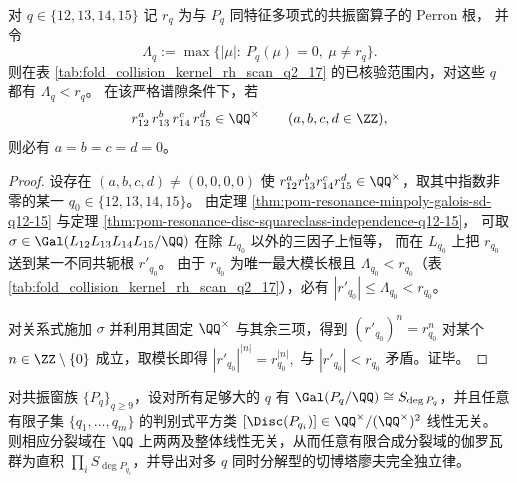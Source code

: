 \begin{theorem}\label{thm:pom-resonance-perron-multiplicative-independence-q12-15}
对 \(q\in\{12,13,14,15\}\) 记 \(r_q\) 为与 \(P_q\) 同特征多项式的共振窗算子的 Perron 根，
并令
\[
\Lambda_q:=\max\{|\mu|:\ P_q(\mu)=0,\ \mu\neq r_q\}.
\]
则在表 \ref{tab:fold_collision_kernel_rh_scan_q2_17} 的已核验范围内，对这些 \(q\) 都有 \(\Lambda_q<r_q\)。
在该严格谱隙条件下，若
\[
r_{12}^{a}\,r_{13}^{b}\,r_{14}^{c}\,r_{15}^{d}\in\QQ^\times
\qquad(a,b,c,d\in\ZZ),
\]
则必有 \(a=b=c=d=0\)。
\end{theorem}
\begin{proof}
设存在 \((a,b,c,d)\neq (0,0,0,0)\) 使 \(r_{12}^{a}r_{13}^{b}r_{14}^{c}r_{15}^{d}\in\QQ^\times\)，取其中指数非零的某一 \(q_0\in\{12,13,14,15\}\)。
由定理 \ref{thm:pom-resonance-minpoly-galois-sd-q12-15} 与定理 \ref{thm:pom-resonance-disc-squareclass-independence-q12-15}，
可取 \(\sigma\in\Gal(L_{12}L_{13}L_{14}L_{15}/\QQ)\) 在除 \(L_{q_0}\) 以外的三因子上恒等，
而在 \(L_{q_0}\) 上把 \(r_{q_0}\) 送到某一不同共轭根 \(r'_{q_0}\)。
由于 \(r_{q_0}\) 为唯一最大模长根且 \(\Lambda_{q_0}<r_{q_0}\)（表 \ref{tab:fold_collision_kernel_rh_scan_q2_17}），必有 \(|r'_{q_0}|\le \Lambda_{q_0}<r_{q_0}\)。

对关系式施加 \(\sigma\) 并利用其固定 \(\QQ^\times\) 与其余三项，得到
\(
(r'_{q_0})^{n}=r_{q_0}^{n}
\)
对某个 \(n\in\ZZ\setminus\{0\}\) 成立，取模长即得
\(
|r'_{q_0}|^{|n|}=r_{q_0}^{|n|},
\)
与 \(|r'_{q_0}|<r_{q_0}\) 矛盾。证毕。
\end{proof}

\begin{conjecture}[共振窗分裂域的判别式平方类无限独立性]\label{conj:pom-resonance-disc-squareclass-infinite-independence}
对共振窗族 \(\{P_q\}_{q\ge 9}\)，设对所有足够大的 \(q\) 有 \(\Gal(P_q/\QQ)\cong S_{\deg P_q}\)，并且任意有限子集 \(\{q_1,\dots,q_m\}\) 的判别式平方类
\(
[\Disc(P_{q_i})]\in \QQ^\times/(\QQ^\times)^2
\)
线性无关。
则相应分裂域在 \(\QQ\) 上两两及整体线性无关，从而任意有限合成分裂域的伽罗瓦群为直积 \(\prod_i S_{\deg P_{q_i}}\)，并导出对多 \(q\) 同时分解型的切博塔廖夫完全独立律。
\end{conjecture}

